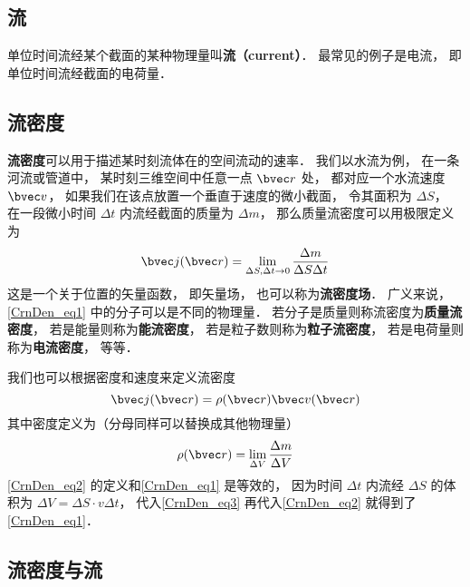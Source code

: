 

\subsection{流}
单位时间流经某个截面的某种物理量叫\textbf{流（current）}． 最常见的例子是电流， 即单位时间流经截面的电荷量．

\subsection{流密度}
\textbf{流密度}可以用于描述某时刻流体在的空间流动的速率． 我们以水流为例， 在一条河流或管道中， 某时刻三维空间中任意一点 $\bvec r$ 处， 都对应一个水流速度 $\bvec v$， 如果我们在该点放置一个垂直于速度的微小截面， 令其面积为 $\Delta S$， 在一段微小时间 $\Delta t$ 内流经截面的质量为 $\Delta m$， 那么质量流密度可以用极限定义为
\begin{equation}\label{CrnDen_eq1}
\bvec j(\bvec r) = \lim_{\Delta S, \Delta t \to 0} \frac{\Delta m}{\Delta S \Delta t}
\end{equation}
这是一个关于位置的矢量函数， 即矢量场， 也可以称为\textbf{流密度场}． 广义来说， \autoref{CrnDen_eq1} 中的分子可以是不同的物理量． 若分子是质量则称流密度为\textbf{质量流密度}， 若是能量则称为\textbf{能流密度}， 若是粒子数则称为\textbf{粒子流密度}， 若是电荷量则称为\textbf{电流密度}， 等等． 

我们也可以根据密度和速度来定义流密度
\begin{equation}\label{CrnDen_eq2}
\bvec j(\bvec r) = \rho(\bvec r) \bvec v(\bvec r)
\end{equation}
其中密度定义为（分母同样可以替换成其他物理量）
\begin{equation}\label{CrnDen_eq3}
\rho(\bvec r) = \lim_{\Delta V} \frac{\Delta m}{\Delta V}
\end{equation}
\autoref{CrnDen_eq2} 的定义和\autoref{CrnDen_eq1} 是等效的， 因为时间 $\Delta t$ 内流经 $\Delta S$ 的体积为 $\Delta V = \Delta S \cdot v  \Delta t$， 代入\autoref{CrnDen_eq3} 再代入\autoref{CrnDen_eq2} 就得到了\autoref{CrnDen_eq1}．

\subsection{流密度与流}
